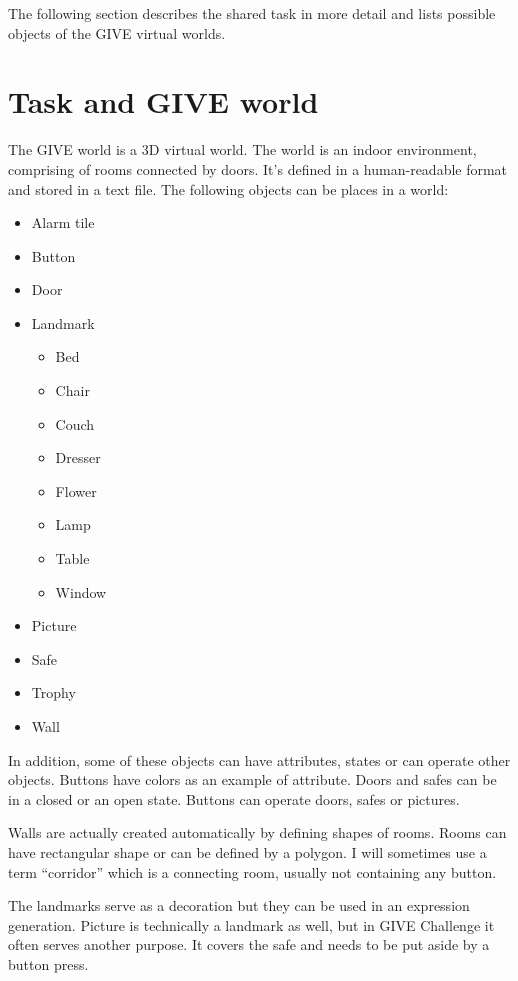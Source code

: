 The following section describes the shared task in more detail and lists possible objects of the GIVE virtual worlds.

\section{Task and GIVE world}
\label{sec:task-give-world}
The GIVE world is a 3D virtual world. The world is an indoor environment, comprising of rooms connected by doors. It's defined in a human-readable format and stored in a text file. The following objects can be places in a world:

\begin{itemize}
\item
Alarm tile
\item
Button
\item
Door
\item 
Landmark
	\begin{itemize}
	\item
	Bed	
	\item
	Chair	
	\item
	Couch	
	\item
	Dresser
	\item
	Flower	
	\item
	Lamp
	\item
	Table
	\item
	Window
	\end{itemize}
\item
Picture
\item
Safe
\item
Trophy
\item
Wall
\end{itemize}

In addition, some of these objects can have attributes, states or can operate other objects. Buttons have colors as an example of attribute. Doors and safes can be in a closed or an open state. Buttons can operate doors, safes or pictures.

Walls are actually created automatically by defining shapes of rooms. Rooms can have rectangular shape or can be defined by a polygon. I will sometimes use a term ``corridor'' which is a connecting room, usually not containing any button.

The landmarks serve as a decoration but they can be used in an expression generation. Picture is technically a landmark as well, but in GIVE Challenge it often serves another purpose. It covers the safe and needs to be put aside by a button press.

